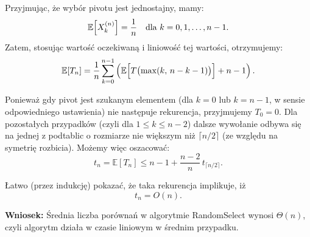 \documentclass[11pt,a4paper]{article}
\begin{document}
\begin{itemize}
\begin{itemize}
                Przyjmując, że wybór pivotu jest jednostajny, mamy:
                \[
                    \mathbb{E}\Bigl[X^{(n)}_k\Bigr] = \frac{1}{n} \quad \text{dla } k=0,1,\dots,n-1.
                \]
                Zatem, stosując wartość oczekiwaną i liniowość tej wartości, otrzymujemy:
                \[
                    \mathbb{E}[T_n] = \frac{1}{n} \sum_{k=0}^{n-1} \left( \mathbb{E}\Bigl[T\bigl(\max(k,\, n-k-1)\bigr)\Bigr] + n-1 \right).
                \]

                Ponieważ gdy pivot jest szukanym elementem (dla $k=0$ lub $k=n-1$, w sensie odpowiedniego ustawienia) nie następuje rekurencja, przyjmujemy $T_0 = 0$. Dla pozostałych przypadków (czyli dla $1 \le k \le n-2$) dalsze wywołanie odbywa się na jednej z podtablic o rozmiarze nie większym niż $\lceil n/2 \rceil$ (ze względu na symetrię rozbicia). Możemy więc oszacować:
                \[
                    t_n = \mathbb{E}[T_n] \le n-1 + \frac{n-2}{n}\, t_{\lceil n/2 \rceil}.
                \]

                Łatwo (przez indukcję) pokazać, że taka rekurencja implikuje, iż
                \[
                    t_n = O(n).
                \]

                \bigskip

                \textbf{Wniosek:} Średnia liczba porównań w algorytmie RandomSelect wynosi $\Theta(n)$, czyli algorytm działa w czasie liniowym w średnim przypadku.

        \end{itemize}
\end{itemize}
\end{document}
